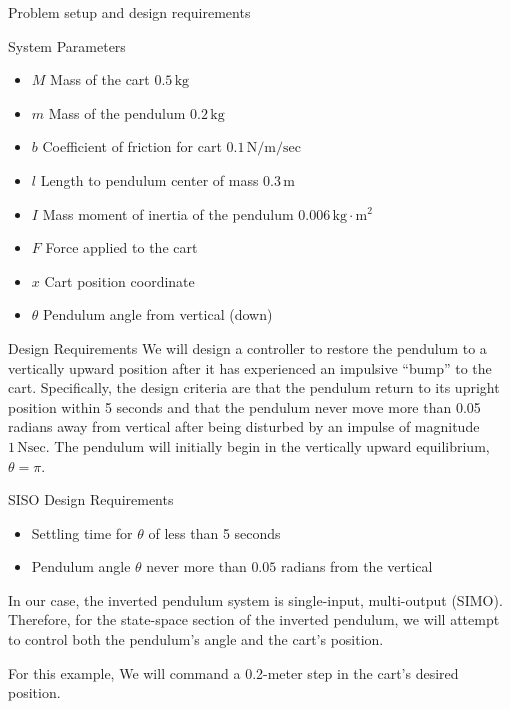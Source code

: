 \begin{frame}{Problem setup and design requirements}
\begin{block}{System Parameters}
\begin{itemize}
\item
  \(M\) Mass of the cart \(0.5 \, \text{kg}\)
\item
  \(m\) Mass of the pendulum \(0.2 \, \text{kg}\)
\item
  \(b\) Coefficient of friction for cart \(0.1 \, \text{N/m/sec}\)
\item
  \(l\) Length to pendulum center of mass \(0.3 \, \text{m}\)
\item
  \(I\) Mass moment of inertia of the pendulum
  \(0.006 \, \text{kg}\cdot\text{m}^2\)
\item
  \(F\) Force applied to the cart
\item
  \(x\) Cart position coordinate
\item
  \(\theta\) Pendulum angle from vertical (down)
\end{itemize}
\end{block}

\begin{block}{Design Requirements}
\protect{}\label{design-requirements}
We will design a controller to restore the pendulum to a vertically
upward position after it has experienced an impulsive ``bump'' to the
cart. Specifically, the design criteria are that the pendulum return to
its upright position within 5 seconds and that the pendulum never move
more than 0.05 radians away from vertical after being disturbed by an
impulse of magnitude \(1 \, \text{Nsec}\). The pendulum will initially
begin in the vertically upward equilibrium, \(\theta = \pi\).

\begin{block}{SISO Design Requirements}
\protect{}\label{siso-design-requirements}
\begin{itemize}
\item
  Settling time for \(\theta\) of less than 5 seconds
\item
  Pendulum angle \(\theta\) never more than \(0.05\) radians from the
  vertical
\end{itemize}

In our case, the inverted pendulum system is single-input, multi-output
(SIMO). Therefore, for the state-space section of the inverted pendulum,
we will attempt to control both the pendulum's angle and the cart's
position.

For this example, We will command a 0.2-meter step in the cart's desired
position.
\end{block}


\end{block}
\end{frame}
